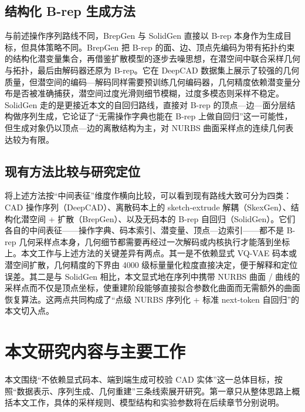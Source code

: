 \subsection{结构化 B-rep 生成方法}

与前述操作序列路线不同，BrepGen\cite{xu_2024_brepgen} 与 SolidGen\cite{jayaraman_2022_solidgen} 直接以 B-rep 本身作为生成目标，但具体策略不同。BrepGen 把 B-rep 的面、边、顶点先编码为带有拓扑约束的结构化潜变量集合，再借鉴扩散模型的逐步去噪思想\cite{ho_2020_ddpm}，在潜空间中联合采样几何与拓扑，最后由解码器还原为 B-rep。它在 DeepCAD 数据集上展示了较强的几何质量，但潜空间的编码—解码同样需要预训练几何编码器，几何精度依赖潜变量分布是否被准确捕获，潜空间过度光滑则细节模糊，过度多模态则采样不稳定。SolidGen 走的是更接近本文的自回归路线，直接对 B-rep 的顶点—边—面分层结构做序列生成，它论证了“无需操作字典也能在 B-rep 上做自回归”这一可能性，但生成对象仍以顶点—边的离散结构为主，对 NURBS 曲面采样点的连续几何表达较为有限。

\subsection{现有方法比较与研究定位}

将上述方法按“中间表征”维度作横向比较，可以看到现有路线大致可分为四类：CAD 操作序列（DeepCAD）、离散码本上的 sketch-extrude 解耦（SkexGen）、结构化潜空间 + 扩散（BrepGen）、以及无码本的 B-rep 自回归（SolidGen）。它们各自的中间表征——操作字典、码本索引、潜变量、顶点—边索引——都不是 B-rep 几何采样点本身，几何细节都需要再经过一次解码或内核执行才能落到坐标上。本文工作与上述方法的关键差异有两点。其一是不依赖显式 VQ-VAE 码本\cite{van_den_oord_2017_vqvae}或潜空间扩散，几何精度的下界由 4000 级标量量化粒度直接决定，便于解释和定位误差。其二是与 SolidGen 相比，本文显式地在序列中携带 NURBS 曲面 / 曲线的采样点而不仅是顶点坐标，使重建阶段能够直接拟合参数化曲面而无需额外的曲面恢复算法。这两点共同构成了“点级 NURBS 序列化 + 标准 next-token 自回归”的本文切入点。


\section{本文研究内容与主要工作}

本文围绕“不依赖显式码本、端到端生成可校验 CAD 实体”这一总体目标，按照“数据表示、序列生成、几何重建”三条线索展开研究。第一章只从整体思路上概括本文工作，具体的采样规则、模型结构和实验参数将在后续章节分别说明。

